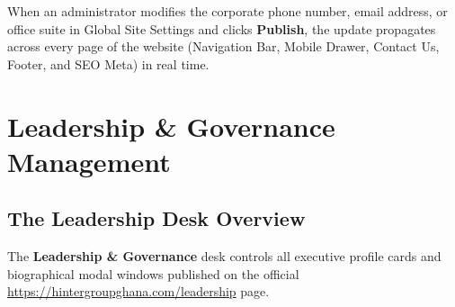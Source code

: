 \documentclass[11pt,a4paper,oneside]{book}
\begin{document}
\begin{goldbox}
When an administrator modifies the corporate phone number, email address, or office suite in Global Site Settings and clicks \textbf{Publish}, the update propagates across every page of the website (Navigation Bar, Mobile Drawer, Contact Us, Footer, and SEO Meta) in real time.
\end{goldbox}

\chapter{Leadership \& Governance Management}
\label{chap:leadership}

\section{The Leadership Desk Overview}
The \textbf{Leadership \& Governance} desk controls all executive profile cards and biographical modal windows published on the official \url{https://hintergroupghana.com/leadership} page.
\end{document}

